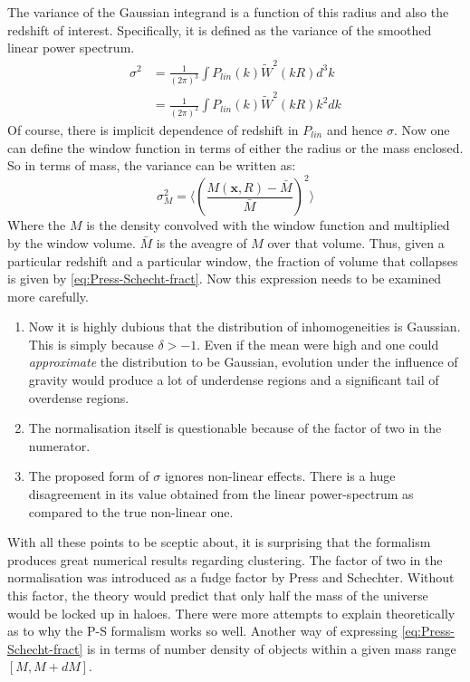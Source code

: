 \documentclass[12pt,a4paper,twoside]{book}
\begin{document}
			The  variance of the Gaussian integrand is a function of this radius and also the redshift of interest. Specifically, it is defined as the variance of the smoothed linear power spectrum. 
			$$
				\begin{aligned}
					\sigma^2&=\frac{1}{(2\pi)^3}\int P_{lin}(k)\tilde{W}^2(kR)d^3k\\
					&=\frac{1}{(2\pi)^2}\int P_{lin}(k)\tilde{W}^2(kR)k^2dk
				\end{aligned}
			$$
			Of course, there is implicit dependence of redshift in $P_{lin}$ and hence $\sigma$. Now one can define the window function in terms of either the radius or the mass enclosed. So in terms of mass, the variance can be written as:
			$$
				\sigma^2_M=\Big\langle\left(\frac{M(\mathbf{x},R)-\bar{M}}{\bar{M}}\right)^2\Big\rangle
			$$
			Where the $M$ is the density convolved with the window function and multiplied by the window volume. $\bar{M}$ is the aveagre of $M$ over that volume. 
			Thus, given a particular redshift and a particular window, the fraction of volume that collapses is given by \ref{eq:Press-Schecht-fract}. Now this expression needs to be examined more carefully.
			\begin{enumerate}
				\item Now it is highly dubious that the distribution of inhomogeneities is Gaussian. This is simply because $\delta>-1$. Even if the mean were high and one could \emph{approximate} the distribution to be Gaussian, evolution under the influence of gravity would produce a lot of underdense regions and a significant tail of overdense regions. 
				\item The normalisation itself is questionable because of the factor of two in the numerator.
				\item The proposed form of $\sigma$ ignores non-linear effects. There is a huge disagreement in its value obtained from the linear power-spectrum as compared to the true non-linear one.
			\end{enumerate}
			With all these points to be sceptic about, it is surprising that the formalism produces great numerical results regarding clustering. The factor of two in the normalisation was introduced as a fudge factor by Press and Schechter. Without this factor, the theory would predict that only half the mass of the universe would be locked up in haloes. There were more attempts to explain theoretically as to why the P-S formalism works so well.
			Another way of expressing \ref{eq:Press-Schecht-fract} is in terms of number density of objects within a given mass range $[M,M+dM]$.
\end{document}
